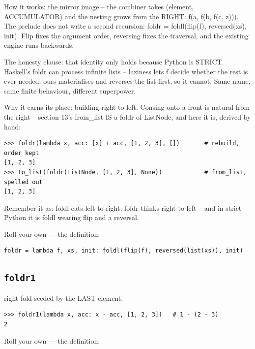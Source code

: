 \documentclass[10pt,letterpaper]{book}
\begin{document}
How it works: the mirror image -- the combiner takes (element, ACCUMULATOR) and the nesting grows from the RIGHT: f(a, f(b, f(c, z))). The prelude does not write a second recursion: foldr = foldl(flip(f), reversed(xs), init). Flip fixes the argument order, reversing fixes the traversal, and the existing engine runs backwards.


The honesty clause: that identity only holds because Python is STRICT. Haskell's foldr can process infinite lists -- laziness lets f decide whether the rest is ever needed; ours materialises and reverses the list first, so it cannot. Same name, same finite behaviour, different superpower.


Why it earns its place: building right-to-left. Consing onto a front is natural from the right -- section 13's from\_list IS a foldr of ListNode, and here it is, derived by hand:

\begin{lstlisting}[style=ex]
>>> foldr(lambda x, acc: [x] + acc, [1, 2, 3], [])       # rebuild, order kept
[1, 2, 3]
>>> to_list(foldr(ListNode, [1, 2, 3], None))            # from_list, spelled out
[1, 2, 3]
\end{lstlisting}

Remember it as: foldl eats left-to-right; foldr thinks right-to-left -- and in strict Python it is foldl wearing flip and a reversal.


Roll your own --- the definition:

\begin{lstlisting}[style=ex]
foldr = lambda f, xs, init: foldl(flip(f), reversed(list(xs)), init)
\end{lstlisting}

\subsection{\texttt{foldr1}}\label{def:foldr1}
right fold seeded by the LAST element.
\begin{lstlisting}[style=ex]
>>> foldr1(lambda x, acc: x - acc, [1, 2, 3])   # 1 - (2 - 3)
2
\end{lstlisting}

Roll your own --- the definition:
\end{document}
